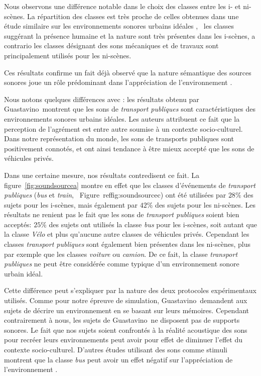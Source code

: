 Nous observons une différence notable dans le choix des classes entre les i- et ni-scènes. La répartition des classes est très proche de celles obtenues dans une étude similaire sur les environnements sonores urbains idéales \citep{guastavino2006ideal}, \ie~les classes suggérant la présence humaine et la nature sont très présentes dans les i-scènes, a contrario les classes désignant des sons mécaniques et de travaux sont principalement utilisés pour les ni-scènes.

Ces résultats confirme un fait déjà observé que la nature sémantique des sources sonores joue un rôle prédominant dans l'appréciation de l'environnement \citep{raimbault2005urban,dubois2006cognitive}.

Nous notons quelques différences avec \citep{guastavino2006ideal}: les résultats obtenu par Guastavino~\al montrent que les sons de \emph{transport publiques} sont caractéristiques des environnements sonores urbains idéales. Les auteurs attribuent ce fait que la perception de l'agrément est entre autre soumise à un contexte socio-culturel. Dans notre représentation du monde, les sons de transports publiques sont positivement connotés, et ont ainsi tendance à être mieux accepté que les sons de véhicules privés.

Dans une certaine mesure, nos résultats contredisent ce fait. La figure~\ref{fig:soundsourcea}  montre en effet que les classes d'événements de \emph{transport publiques} (\emph{bus} et \emph{train}, \cf~Figure~ref{fig:soundsourcec}) ont été utilisées par $28\%$ des sujets pour les i-scènes, mais également  par $42\%$ des sujets pour les ni-scènes. Les résultats ne renient pas le fait que  les sons de \emph{transport publiques} soient bien acceptés: $25\%$ des sujets ont utilisés la classe \emph{bus} pour les i-scènes, soit autant que la classe \emph{Vélo} et plus qu'aucune autre classes de véhicules privés. Cependant les classes \emph{transport publiques} sont également bien présentes dans les ni-scènes, plus par exemple que les classes \emph{voiture} ou \emph{camion}. De ce fait, la classe \emph{transport publiques} ne peut être considérée comme typique d'un environnement sonore urbain idéal.

Cette différence peut s'expliquer par la nature des deux protocoles expérimentaux utilisés. Comme pour notre épreuve de simulation, Guastavino~\al demandent aux sujets de décrire un environnement en se basant sur leurs mémoires. Cependant contrairement à nous, les sujets de Guastavino~\al ne disposent pas de supports sonores. Le fait que nos sujets soient confrontés à la réalité acoustique des sons pour recréer leurs environnements peut avoir pour effet de diminuer l'effet du contexte socio-culturel. D'autres études utilisant des sons comme stimuli montrent que la classe \emph{bus} peut avoir un effet négatif sur l'appréciation de l'environnement \citep{lavandier2006contribution}.

